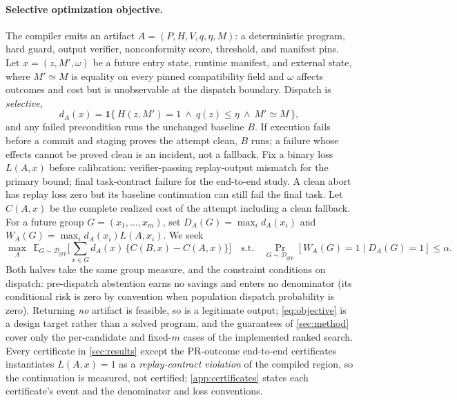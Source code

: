 \paragraph{Selective optimization objective.}
The compiler emits an artifact $A=(P,H,V,q,\eta,M)$: a deterministic program,
hard guard, output verifier, nonconformity score, threshold, and manifest pins.
Let $x=(z,M',\omega)$ be a future entry state, runtime manifest, and external
state, where $M'\simeq M$ is equality on every pinned compatibility field and
$\omega$ affects outcomes and cost but is unobservable at the dispatch boundary.
Dispatch is \emph{selective},
\begin{equation}
  d_A(x) = \mathbf{1}\{\,H(z,M')=1 \ \wedge\ q(z)\le\eta
              \ \wedge\ M'\simeq M\,\},
  \label{eq:dispatch}
\end{equation}
and any failed precondition runs the unchanged baseline $B$. If execution fails
before a commit and staging proves the attempt clean, $B$ runs; a failure whose effects
cannot be proved clean is an incident, not a fallback. Fix a binary loss
$L(A,x)$ before calibration: verifier-passing replay-output mismatch for the primary
bound; final task-contract failure for the end-to-end study. A clean abort
has replay loss zero but its baseline continuation can still fail the final task.
Let $C(A,x)$ be the complete realized cost
of the attempt including a clean fallback. For a future group
$G=(x_1,\ldots,x_m)$, set $D_A(G)=\max_i d_A(x_i)$ and $W_A(G)=\max_i
d_A(x_i)L(A,x_i)$. We seek
\begin{equation}
  \max_A\ \
  \mathbb{E}_{G\sim\mathcal{D}_{\mathrm{grp}}}\!\Big[\textstyle\sum_{x\in G}
    d_A(x)\,\{C(B,x)-C(A,x)\}\Big]
  \quad\text{s.t.}\quad
  \Pr_{G\sim\mathcal{D}_{\mathrm{grp}}}\!\left[W_A(G)=1 \mid D_A(G)=1\right]
  \le \alpha .
  \label{eq:objective}
\end{equation}
Both halves take the same group measure, and the constraint conditions on
dispatch: pre-dispatch abstention earns no savings and enters no denominator
(its conditional risk is zero by convention when population dispatch
probability is zero). Returning \emph{no} artifact is feasible, so \retire{} is
a legitimate output; \cref{eq:objective} is a design target rather than a
solved program, and the guarantees of \cref{sec:method} cover only the
per-candidate and fixed-$m$ cases of the implemented ranked search. Every
certificate in \cref{sec:results} except the PR-outcome end-to-end certificates
instantiates $L(A,x)=1$ as a \emph{replay-contract violation} of the compiled
region, so the continuation is measured, not certified;
\cref{app:certificates} states each certificate's event and the denominator
and loss conventions.
